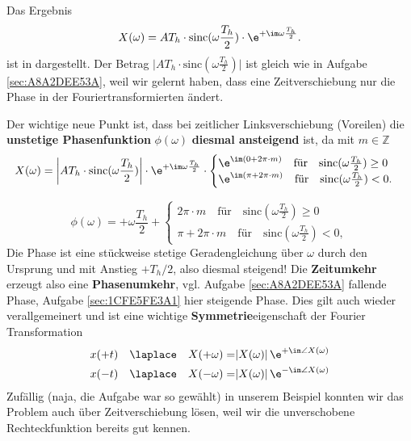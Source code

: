 \begin{Loesung}
Das Ergebnis
\begin{equation}
\label{eq:1CFE5FE3A1_Loesung}
X(\omega) = A T_h \cdot \mathrm{sinc}(\omega\frac{T_h}{2}) \cdot  \e^{+\im\omega\frac{T_h}{2}}.
\end{equation}
ist in  dargestellt. Der Betrag
$\bigg|A T_h \cdot \mathrm{sinc}(\omega\frac{T_h}{2})\bigg|$
ist gleich wie in Aufgabe \ref{sec:A8A2DEE53A}, weil wir gelernt haben, dass
eine Zeitverschiebung nur die Phase in der Fouriertransformierten ändert.
%

Der wichtige neue Punkt ist, dass bei zeitlicher Linksverschiebung (Voreilen)
die \textbf{unstetige Phasenfunktion} $\phi(\omega)$
\textbf{diesmal ansteigend} ist,  da mit $m\in\mathbb{Z}$
\begin{equation}
X(\omega) = \bigg|A T_h \cdot \mathrm{sinc}(\omega\frac{T_h}{2})\bigg|
\cdot  \e^{+\im\omega\frac{T_h}{2}}\cdot
\begin{cases}
\e^{\im (0+2\pi \cdot m)}\quad \text{für}\quad \mathrm{sinc}(\omega\frac{T_h}{2})\geq0\\
\e^{\im (\pi + 2\pi \cdot m)}\quad \text{für}\quad\mathrm{sinc}(\omega\frac{T_h}{2})<0.
\end{cases}
\end{equation}

\begin{equation}
\phi(\omega) = +\omega\frac{T_h}{2} +
\begin{cases}
2\pi \cdot m\quad \text{für}\quad \mathrm{sinc}(\omega\frac{T_h}{2})\geq0\\
\pi + 2\pi \cdot m\quad \text{für}\quad\mathrm{sinc}(\omega\frac{T_h}{2})<0,
\end{cases}
\end{equation}
Die Phase ist eine stückweise stetige Geradengleichung über $\omega$ durch den
Ursprung und mit Anstieg $+T_h/2$, also diesmal steigend!
%
Die \textbf{Zeitumkehr} erzeugt also eine \textbf{Phasenumkehr}, vgl.
Aufgabe \ref{sec:A8A2DEE53A} fallende Phase, Aufgabe \ref{sec:1CFE5FE3A1} hier steigende Phase.
%
Dies gilt auch wieder verallgemeinert und ist eine wichtige \textbf{Symmetrie}eigenschaft
der Fourier Transformation
%
\begin{align}
x(+t) \quad \laplace \quad X(+\omega) =& |X(\omega)| \, \e^{+\im\angle X(\omega)}\\
x(-t) \quad \laplace \quad X(-\omega) =& |X(\omega)| \, \e^{-\im\angle X(\omega)}
\end{align}
%
Zufällig (naja, die Aufgabe war so gewählt)
in unserem Beispiel konnten wir das Problem auch über Zeitverschiebung
lösen, weil wir die unverschobene Rechteckfunktion bereits gut kennen.
\end{Loesung}
